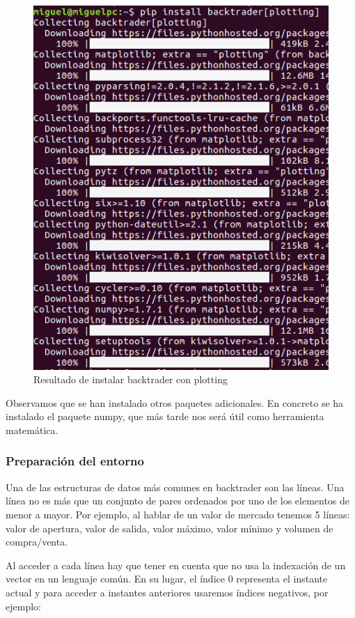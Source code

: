 \documentclass[12pt,a4paper]{article}
\begin{document}
		\begin{figure}[H]
			\centering
			\includegraphics[scale=0.4]{imagenes/pip_backtrader.png}
			\caption{Resultado de instalar backtrader con plotting}
			\label{fig:pip_backtrader}
		\end{figure}
		
		Observamos que se han instalado otros paquetes adicionales. En concreto se ha instalado el paquete numpy, que m\'as tarde nos ser\'a \'util como herramienta matem\'atica.
		
		
		\subsubsection{Preparaci\'on del entorno}
		
		Una de las estructuras de datos m\'as comunes en backtrader son las l\'ineas. Una l\'inea no es m\'as que un conjunto de pares ordenados por uno de los elementos de menor a mayor. Por ejemplo, al hablar de un valor de mercado tenemos 5 l\'ineas: valor de apertura, valor de salida, valor m\'aximo, valor m\'inimo y volumen de compra/venta. 
		
		Al acceder a cada l\'inea hay que tener en cuenta que no usa la indexaci\'on de un vector en un lenguaje com\'un. En su lugar, el \'indice 0 representa el instante actual y para acceder a instantes anteriores usaremos \'indices negativos, por ejemplo:
		
\end{document}
